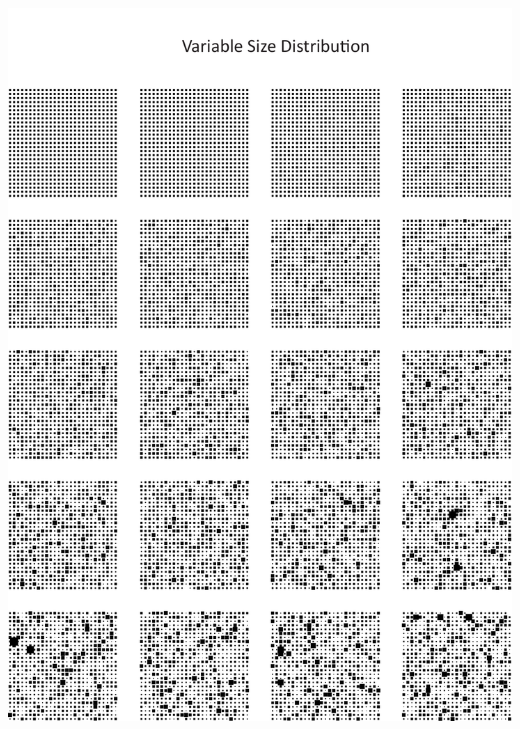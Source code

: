 \documentclass[
  12pt,
  a4paper, twoside]{book}
\begin{document}
\begin{center}\includegraphics[width=1\linewidth]{Appendix/distr} \end{center}

\newpage
\end{document}

